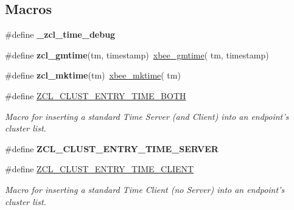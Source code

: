 \subsection*{Macros}
\begin{DoxyCompactItemize}
\item 
\hypertarget{group__zcl__time_ga5d1d038f66ada681b4430b29f7dc4cda}{\#define {\bfseries \-\_\-zcl\-\_\-time\-\_\-debug}}\label{group__zcl__time_ga5d1d038f66ada681b4430b29f7dc4cda}

\item 
\hypertarget{group__zcl__time_ga838affe8c53b76cc63f8113a6f4ca3d4}{\#define {\bfseries zcl\-\_\-gmtime}(tm, timestamp)~\hyperlink{group__xbee__time_ga82532f78c0106d9d57ccc370781f1c0a}{xbee\-\_\-gmtime}( tm, timestamp)}\label{group__zcl__time_ga838affe8c53b76cc63f8113a6f4ca3d4}

\item 
\hypertarget{group__zcl__time_ga55a19a11c22e852cb463f73e28a6e608}{\#define {\bfseries zcl\-\_\-mktime}(tm)~\hyperlink{group__xbee__time_gaed48be3b2d3a20dcd32ea14b52eb4e60}{xbee\-\_\-mktime}( tm)}\label{group__zcl__time_ga55a19a11c22e852cb463f73e28a6e608}

\item 
\#define \hyperlink{group__zcl__time_gaa45500dbe82c2beea426914014e26fff}{Z\-C\-L\-\_\-\-C\-L\-U\-S\-T\-\_\-\-E\-N\-T\-R\-Y\-\_\-\-T\-I\-M\-E\-\_\-\-B\-O\-T\-H}
\begin{DoxyCompactList}\small\item\em Macro for inserting a standard Time Server (and Client) into an endpoint's cluster list. \end{DoxyCompactList}\item 
\#define {\bfseries Z\-C\-L\-\_\-\-C\-L\-U\-S\-T\-\_\-\-E\-N\-T\-R\-Y\-\_\-\-T\-I\-M\-E\-\_\-\-S\-E\-R\-V\-E\-R}
\item 
\#define \hyperlink{group__zcl__time_gac043586e4bfcfa93f631aa144158a17c}{Z\-C\-L\-\_\-\-C\-L\-U\-S\-T\-\_\-\-E\-N\-T\-R\-Y\-\_\-\-T\-I\-M\-E\-\_\-\-C\-L\-I\-E\-N\-T}
\begin{DoxyCompactList}\small\item\em Macro for inserting a standard Time Client (no Server) into an endpoint's cluster list. \end{DoxyCompactList}\end{DoxyCompactItemize}
